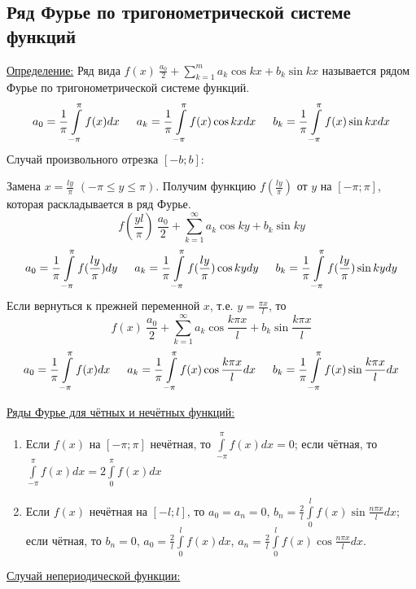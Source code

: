 \documentclass[12pt]{article}
\let\oldint\int
\let\oldsum\sum
\renewcommand{\int}{\oldint\limits}
\renewcommand{\sum}{\oldsum\limits}
\begin{document}
    \subsection{Ряд Фурье по тригонометрической системе функций}\noindent
    \underline{Определение:} Ряд вида $f(x) ~ \frac{a_0}{2} + \sum_{k=1}^{m} a_k \cos kx + b_k \sin kx$ называется рядом Фурье по тригонометрической системе функций.
    \[ a_0 = \frac{1}{\pi} \int_{-\pi}^{\pi}f(x)dx \indent a_k = \frac{1}{\pi} \int_{-\pi}^{\pi} f(x) \cos kx dx \indent b_k = \frac{1}{\pi} \int_{-\pi}^{\pi} f(x)\sin kx dx \]
    Случай произвольного отрезка $[-b; b]$:
    \begin{adjustwidth}{1.5em}{1.5em}
      Замена $x = \frac{ly}{\pi}$ $(-\pi \leq y \leq \pi)$. Получим функцию $f(\frac{ly}{\pi})$ от $y$ на $[-\pi; \pi]$, которая раскладывается в ряд Фурье.
      \[ f(\frac{yl}{\pi}) ~ \frac{a_0}{2} + \sum_{k=1}^{\infty} a_k \cos ky + b_k \sin ky \]
      \[ a_0 = \frac{1}{\pi} \int_{-\pi}^{\pi} f(\frac{ly}{\pi})dy \indent a_k = \frac{1}{\pi} \int_{-\pi}^{\pi} f(\frac{ly}{\pi})\cos ky dy \indent b_k = \frac{1}{\pi} \int_{-\pi}^{\pi} f(\frac{ly}{\pi})\sin ky dy \]
      Если вернуться к прежней переменной $x$, т.е. $y = \frac{\pi x}{l}$, то
      \[ f(x) ~ \frac{a_0}{2} + \sum_{k=1}^{\infty}a_k\cos \frac{k \pi x}{l} + b_k \sin \frac{k\pi x}{l} \]
      \[ a_0 = \frac{1}{\pi} \int_{-\pi}^{\pi} f(x)dx \indent a_k = \frac{1}{\pi} \int_{-\pi}^{\pi} f(x)\cos \frac{k\pi x}{l} dx \indent b_k = \frac{1}{\pi} \int_{-\pi}^{\pi} f(x)\sin \frac{k \pi x}{l} dx \]
    \end{adjustwidth}
    \underline{Ряды Фурье для чётных и нечётных функций:}
    \begin{enumerate}
      \item Если $f(x)$ на $[-\pi; \pi]$ нечётная, то $\int_{-\pi}^{\pi}f(x) dx = 0$; если чётная, то $\int_{-\pi}^{\pi}f(x) dx = 2 \int_{0}^{\pi}f(x)dx$
      \item Если $f(x)$ нечётная на $[-l; l]$, то $a_0 = a_n = 0$, $b_n = \frac{2}{l} \int_{0}^{l} f(x) \sin \frac{n \pi x}{l} dx$; если чётная, то $b_n = 0$, $a_0 = \frac{2}{l} \int_{0}^{l} f(x) dx$, $a_n = \frac{2}{l} \int_{0}^{l} f(x) \cos \frac{n \pi x}{l}dx$.
    \end{enumerate}
    \underline{Случай непериодической функции:}
\end{document}
